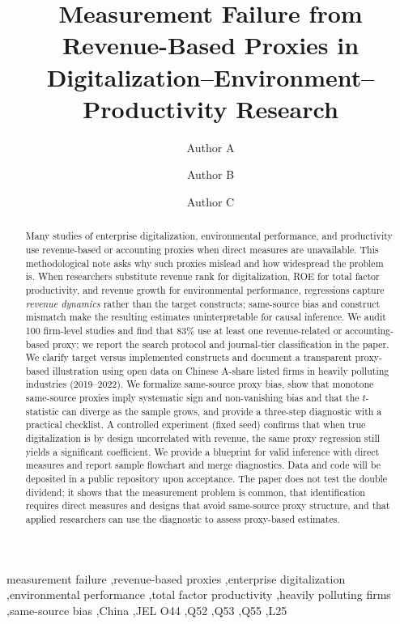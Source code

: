 \documentclass[3p,times,sort&compress]{elsarticle}
\title{Measurement Failure from Revenue-Based Proxies in Digitalization--Environment--Productivity Research}
\author[inst1]{Author A}
\author[inst2]{Author B}
\author[inst3,cor1]{Author C}
\begin{document}
\begin{abstract}
\noindent
Many studies of enterprise digitalization, environmental performance, and productivity use revenue-based or accounting proxies when direct measures are unavailable. This methodological note asks why such proxies mislead and how widespread the problem is. When researchers substitute revenue rank for digitalization, ROE for total factor productivity, and revenue growth for environmental performance, regressions capture \emph{revenue dynamics} rather than the target constructs; same-source bias and construct mismatch make the resulting estimates uninterpretable for causal inference. We audit 100 firm-level studies and find that 83\% use at least one revenue-related or accounting-based proxy; we report the search protocol and journal-tier classification in the paper. We clarify target versus implemented constructs and document a transparent proxy-based illustration using open data on Chinese A-share listed firms in heavily polluting industries (2019--2022). We formalize same-source proxy bias, show that monotone same-source proxies imply systematic sign and non-vanishing bias and that the $t$-statistic can diverge as the sample grows, and provide a three-step diagnostic with a practical checklist. A controlled experiment (fixed seed) confirms that when true digitalization is by design uncorrelated with revenue, the same proxy regression still yields a significant coefficient. We provide a blueprint for valid inference with direct measures and report sample flowchart and merge diagnostics. Data and code will be deposited in a public repository upon acceptance. The paper does not test the double dividend; it shows that the measurement problem is common, that identification requires direct measures and designs that avoid same-source proxy structure, and that applied researchers can use the diagnostic to assess proxy-based estimates.
\end{abstract}

\begin{keyword}
measurement failure \sep revenue-based proxies \sep enterprise digitalization \sep environmental performance \sep total factor productivity \sep heavily polluting firms \sep same-source bias \sep China \sep JEL O44 \sep Q52 \sep Q53 \sep Q55 \sep L25
\end{keyword}
\end{document}
